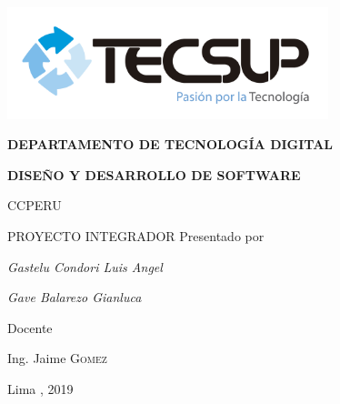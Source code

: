 \begin{titlepage}
	\centering
	\includegraphics[width=0.70\textwidth]{img/logo_tecsup_final}\par\vspace{1cm}
	\vspace{0.30cm}	
	{\scshape\large\bfseries DEPARTAMENTO DE TECNOLOG\'IA DIGITAL \par}
	\vspace{0.60cm}	
	{\scshape\large\bfseries DISEÑO Y DESARROLLO DE SOFTWARE  \par}
	\vspace{2.00cm}		
	{\large\large CCPERU \par}
	\vspace{0.60cm}
	{\scshape\large PROYECTO INTEGRADOR }
	\vspace{0.60cm}
	\vfill
	Presentado por \par
	{\large\itshape { Gastelu Condori Luis Angel }\par}
	{\large\itshape { Gave Balarezo Gianluca }\par}
	\vspace{0.30cm}
	\vfill
	Docente \par
	Ing. Jaime \textsc{ Gomez}
	
  \vspace{0.30cm}
	\vfill
        {\large Lima , 2019 \par}
\end{titlepage}

